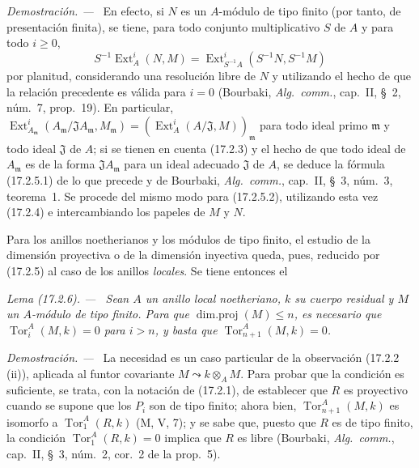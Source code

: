 \documentclass[10pt,oneside]{book}
\makeatletter
\newcommand{\setmanualcurrentlabel}[1]{\def\@currentlabel{#1}}
\newcommand{\oldpage}[2][]{%
  \setcounter{footnote}{0}%
  \marginpar{\scriptsize\textbf{#1}~|~#2}\ignorespaces}
\newenvironment{lemma}[1][]{%
  \setmanualcurrentlabel{#1}\par\medskip\noindent\itshape Lema (#1). ---\ }{\par}
\newenvironment{proof}{%
  \par\medskip\noindent\textit{Demostración. ---\ }}{\par}
\makeatother
\begin{document}
\begin{proof}
En efecto, si $N$ es un $A$-módulo de tipo finito (por tanto, de presentación finita),
se tiene, para todo conjunto multiplicativo $S$ de $A$ y para todo $i\geq0$,
\[
  S^{-1}\operatorname{Ext}^i_A(N,M)
  =\operatorname{Ext}^i_{S^{-1}A}(S^{-1}N,S^{-1}M)
\]
por planitud, considerando una resolución libre de $N$ y utilizando el
hecho de que la relación precedente es válida para $i=0$ (Bourbaki,
\emph{Alg.~comm.}, cap.~II, \S~2, núm.~7, prop.~19). En particular,
$\operatorname{Ext}^i_{A_{\mathfrak{m}}}
(A_{\mathfrak{m}}/\mathfrak{J}A_{\mathfrak{m}},M_{\mathfrak{m}})
=(\operatorname{Ext}^i_A(A/\mathfrak{J},M))_{\mathfrak{m}}$ para todo ideal
primo $\mathfrak{m}$ y todo ideal $\mathfrak{J}$ de $A$; si se tienen
en cuenta (17.2.3) y el hecho de que todo
\oldpage[0\textsubscript{IV-1}]{44}
ideal de $A_{\mathfrak{m}}$ es de la forma $\mathfrak{J}A_{\mathfrak{m}}$
para un ideal adecuado $\mathfrak{J}$ de $A$, se deduce la fórmula
(17.2.5.1) de lo que precede y de Bourbaki, \emph{Alg.~comm.}, cap.~II,
\S~3, núm.~3, teorema~1. Se procede del mismo modo para (17.2.5.2), utilizando esta vez
(17.2.4) e intercambiando los papeles de $M$ y $N$.
\end{proof}

Para los anillos noetherianos y los módulos de tipo finito, el estudio de la
dimensión proyectiva o de la dimensión inyectiva queda, pues, reducido por
(17.2.5) al caso de los anillos \emph{locales}. Se tiene entonces el

\begin{lemma}[17.2.6]
\label{0.17.2.6-es}
Sean $A$ un anillo local noetheriano, $k$ su cuerpo residual y $M$ un
$A$-módulo de tipo finito. Para que $\operatorname{dim.proj}(M)\leq n$, es
necesario que $\operatorname{Tor}^A_i(M,k)=0$ para $i>n$, y basta que
$\operatorname{Tor}^A_{n+1}(M,k)=0$.
\end{lemma}

\begin{proof}
La necesidad es un caso particular de la observación (17.2.2 (ii)), aplicada al
funtor covariante $M\leadsto k\otimes_A M$. Para probar que la condición es
suficiente, se trata, con la notación de (17.2.1), de establecer que $R$ es
proyectivo cuando se supone que los $P_i$ son de tipo finito; ahora bien,
$\operatorname{Tor}^A_{n+1}(M,k)$ es isomorfo a
$\operatorname{Tor}^A_1(R,k)$ (M, V, 7); y se sabe que, puesto que $R$ es de
tipo finito, la condición $\operatorname{Tor}^A_1(R,k)=0$ implica que $R$ es
libre (Bourbaki, \emph{Alg.~comm.}, cap.~II, \S~3, núm.~2, cor.~2 de la
prop.~5).
\end{proof}
\end{document}
